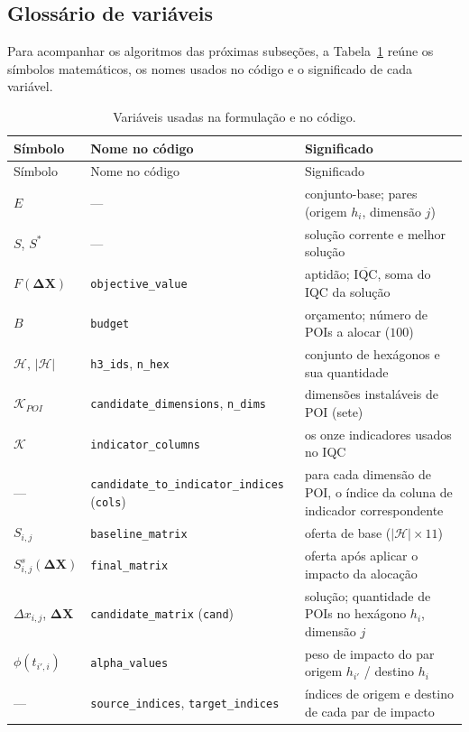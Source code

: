 \documentclass[11pt,a4paper]{article}
\newcommand{\code}[1]{\texttt{#1}}
\begin{document}
\subsection{Glossário de variáveis}

Para acompanhar os algoritmos das próximas subseções, a Tabela~\ref{tab:glossario} reúne os símbolos matemáticos, os nomes usados no código e o significado de cada variável.

\renewcommand{\arraystretch}{1.25}
\begin{longtable}{@{}p{2.4cm} p{4.2cm} p{7.6cm}@{}}
\caption{Variáveis usadas na formulação e no código.}\label{tab:glossario}\\
\toprule
Símbolo & Nome no código & Significado \\
\midrule
\endfirsthead
\toprule
Símbolo & Nome no código & Significado \\
\midrule
\endhead
$E$ & --- & conjunto-base; pares (origem $h_i$, dimensão $j$) \\
$S$, $S^\ast$ & --- & solução corrente e melhor solução \\
$F(\mathbf{\Delta X})$ & \code{objective\_value} & aptidão; $\overline{\mathrm{IQC}}$, soma do IQC da solução \\
$B$ & \code{budget} & orçamento; número de POIs a alocar ($100$) \\
$\mathcal{H}$, $|\mathcal{H}|$ & \code{h3\_ids}, \code{n\_hex} & conjunto de hexágonos e sua quantidade \\
$\mathcal{K}_{POI}$ & \code{candidate\_dimensions}, \code{n\_dims} & dimensões instaláveis de POI (sete) \\
$\mathcal{K}$ & \code{indicator\_columns} & os onze indicadores usados no IQC \\
--- & \code{candidate\_to\_indicator\_indices} (\code{cols}) & para cada dimensão de POI, o índice da coluna de indicador correspondente \\
$S_{i,j}$ & \code{baseline\_matrix} & oferta de base ($|\mathcal{H}| \times 11$) \\
$S^s_{i,j}(\mathbf{\Delta X})$ & \code{final\_matrix} & oferta após aplicar o impacto da alocação \\
$\Delta x_{i,j}$, $\mathbf{\Delta X}$ & \code{candidate\_matrix} (\code{cand}) & solução; quantidade de POIs no hexágono $h_i$, dimensão $j$ \\
$\phi(t_{i',i})$ & \code{alpha\_values} & peso de impacto do par origem $h_{i'}$ / destino $h_i$ \\
--- & \code{source\_indices}, \code{target\_indices} & índices de origem e destino de cada par de impacto \\

\end{longtable}
\end{document}
